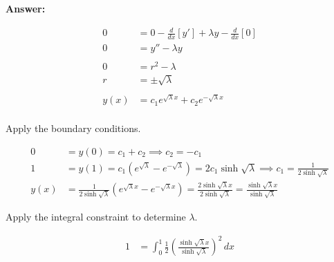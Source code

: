 \documentclass[12pt]{article}
\begin{document}
\begin{enumerate}
{\bf Answer:} 

\begin{align*}
0 &= 0 - \frac{d}{dx}[y'] + \lambda y - \frac{d}{dx}[0] \\
0 &= y'' - \lambda y \\
&\\
0 &= r^2 - \lambda \\
r &= \pm \sqrt{\lambda} \\
& \\
y(x) &= c_1e^{\sqrt{\lambda}x} + c_2 e^{-\sqrt{\lambda}x} \\
\end{align*}

Apply the boundary conditions.

\begin{align*}
0 &= y(0) = c_1 + c_2 \implies c_2 = -c_1\\
1 &= y(1) = c_1 \left(e^{\sqrt{\lambda}} -e^{-\sqrt{\lambda}} \right) = 2c_1 \sinh \sqrt{\lambda} \implies c_1 = \frac{1}{2\sinh \sqrt{ \lambda}} \\
y(x) &= \frac{1}{2\sinh \sqrt{ \lambda}}\left(e^{\sqrt{\lambda} x} -e^{-\sqrt{\lambda} x} \right) = \frac{2\sinh \sqrt{\lambda}x }{2\sinh \sqrt{ \lambda}} = \frac{\sinh \sqrt{ \lambda}x }{\sinh \sqrt{ \lambda}}
\end{align*}

Apply the integral constraint to determine $\lambda$. 

\begin{align*}
1 &= \int_0^1 \frac{1}{2}\left(\frac{\sinh \sqrt{ \lambda}x }{\sinh \sqrt{ \lambda}}\right)^2 \, dx 
\end{align*}
\end{enumerate}
\end{document}

